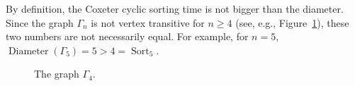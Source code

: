 \documentclass[11pt]{amsart}
\numberwithin{equation}{section}
\newcommand{\todo}[1]{\vspace{5 mm}\par \noindent
\marginpar{\textsc{ToDo}} \framebox{\begin{minipage}[c]{0.95
\textwidth}
 #1 \end{minipage}}\vspace{5 mm}\par}
\newcommand{\D}{{\operatorname{Diameter}}}
\newcommand{\Sort}{{\operatorname{Sort}}}
\begin{document}

By definition, the  Coxeter cyclic sorting time is not bigger than the diameter.
Since the graph $\Gamma_n$ is not vertex transitive for $n\ge 4$ (see, e.g., Figure~\ref{fig:gamma4}), these two numbers are not necessarily equal. 
For example, for $n=5$, $\D(\Gamma_5)=5>4=\Sort_5$. 

\begin{figure}[ht]
\begin{center} 
\end{center}
    \caption{The graph $\Gamma_4$.}
    \label{fig:gamma4}
\end{figure}

\end{document}
